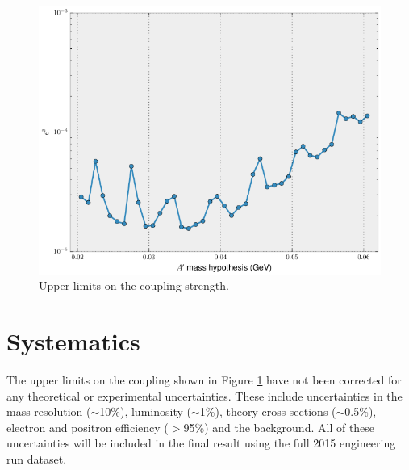 \begin{figure}[ht]
    \centering
    \includegraphics[width=\textwidth]{images/final_coupling_upper_limits.png}
    \caption{Upper limits on the coupling strength.}
    \label{fig:epsilon_upper_limit}
\end{figure}

\section{Systematics}

The upper limits on the coupling shown in Figure \ref{fig:epsilon_upper_limit}
have not been corrected for any theoretical or experimental uncertainties.  These
include uncertainties in the mass resolution ($\sim$10\%), luminosity ($\sim$1\%),
theory cross-sections ($\sim$0.5\%), electron and positron efficiency ($>$95\%)
and the background.  All of these uncertainties will be included in the final
result using the full 2015 engineering run dataset. 

